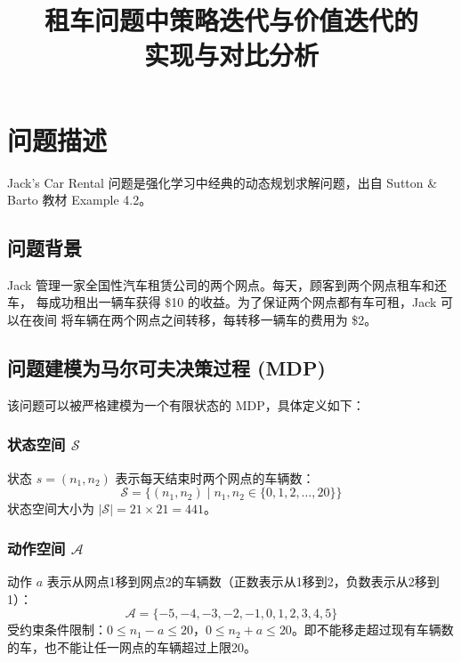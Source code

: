 \documentclass[12pt,a4paper]{ctexart}
\title{\textbf{租车问题中策略迭代与价值迭代的\\实现与对比分析}}
\author{}
\date{}
\begin{document}
\maketitle

\tableofcontents
\newpage

\section{问题描述}

Jack's Car Rental 问题是强化学习中经典的动态规划求解问题，出自 Sutton \& Barto 教材 Example 4.2。

\subsection{问题背景}

Jack 管理一家全国性汽车租赁公司的两个网点。每天，顾客到两个网点租车和还车，
每成功租出一辆车获得 \$10 的收益。为了保证两个网点都有车可租，Jack 可以在夜间
将车辆在两个网点之间转移，每转移一辆车的费用为 \$2。

\subsection{问题建模为马尔可夫决策过程 (MDP)}

该问题可以被严格建模为一个有限状态的 MDP，具体定义如下：

\subsubsection{状态空间 $\mathcal{S}$}

状态 $s = (n_1, n_2)$ 表示每天结束时两个网点的车辆数：
\begin{equation}
\mathcal{S} = \{(n_1, n_2) \mid n_1, n_2 \in \{0, 1, 2, \ldots, 20\}\}
\end{equation}
状态空间大小为 $|\mathcal{S}| = 21 \times 21 = 441$。

\subsubsection{动作空间 $\mathcal{A}$}

动作 $a$ 表示从网点1移到网点2的车辆数（正数表示从1移到2，负数表示从2移到1）：
\begin{equation}
\mathcal{A} = \{-5, -4, -3, -2, -1, 0, 1, 2, 3, 4, 5\}
\end{equation}
受约束条件限制：$0 \leq n_1 - a \leq 20$，$0 \leq n_2 + a \leq 20$。即不能移走超过现有车辆数的车，也不能让任一网点的车辆超过上限20。
\end{document}
